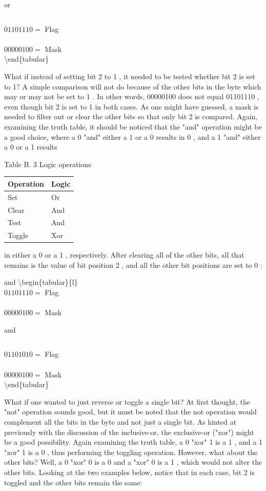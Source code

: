 \documentclass[10pt]{book}
\begin{document}
 or $\quad$\begin{tabular}{l}
\end{tabular}

$01101110=$ Flag \\
\\
$00000100=$ Mask\\
\textbackslash end\{tabular\}

What if instead of setting bit 2 to 1 , it needed to be tested whether bit 2 is set to 1? A simple comparison will not do because of the other bits in the byte which may or may not be set to 1 . In other words, 00000100 does not equal 01101110 , even though bit 2 is set to 1 in both cases. As one might have guessed, a mask is needed to filter out or clear the other bits so that only bit 2 is compared. Again, examining the truth table, it should be noticed that the "and" operation might be a good choice, where a 0 "and" either a 1 or a 0 results in 0 , and a 1 "and" either a 0 or a 1 results

Table B. 3 Logic operations

\begin{center}
\begin{tabular}{|l|l|}
\hline
Operation & Logic \\
\hline
Set & Or \\
\hline
Clear & And \\
\hline
Test & And \\
\hline
Toggle & Xor \\
\hline
\end{tabular}
\end{center}

in either a 0 or a 1 , respectively. After clearing all of the other bits, all that remains is the value of bit position 2 , and all the other bit positions are set to 0 :

and \textbackslash begin\{tabular\}\{l\}\\
$01101110=$ Flag \\
\\
$00000100=$ Mask

 and \begin{tabular}{l}
\end{tabular}

$01101010=$ Flag \\
\\
$00000100=$ Mask\\
\textbackslash end\{tabular\}

What if one wanted to just reverse or toggle a single bit? At first thought, the "not" operation sounds good, but it must be noted that the not operation would complement all the bits in the byte and not just a single bit. As hinted at previously with the discussion of the inclusive-or, the exclusive-or ("xor") might be a good possibility. Again examining the truth table, a 0 "xor" 1 is a 1 , and a 1 "xor" 1 is a 0 , thus performing the toggling operation. However, what about the other bits? Well, a 0 "xor" 0 is a 0 and a "xor" 0 is a 1 , which would not alter the other bits. Looking at the two examples below, notice that in each case, bit 2 is toggled and the other bits remain the same:
\end{document}
